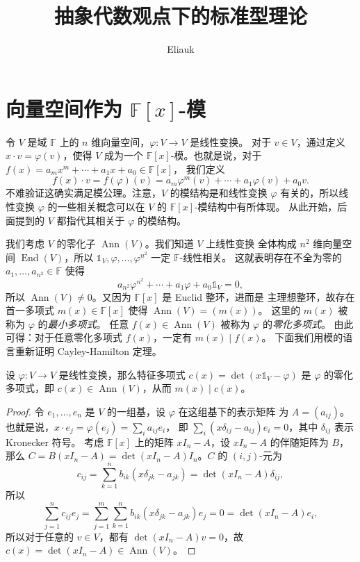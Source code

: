 \documentclass[fontset=none,zihao=-4]{Notes}
\title{\sffamily 抽象代数观点下的标准型理论}
\author{Eliauk}
\DeclareMathOperator\End{End}
\DeclareMathOperator\Ann{Ann}
\begin{document}
\maketitle

\tableofcontents

\section{向量空间作为 \texorpdfstring{$\mathbb{F}[x]$}{F[x]}-模}

令 $V$ 是域 $\mathbb{F}$ 上的 $n$ 维向量空间，$\varphi:V\to V$ 是线性变换。
对于 $v\in V$，通过定义 $x\cdot v=\varphi(v)$，使得 $V$
成为一个 $\mathbb{F}[x]$-模。也就是说，对于 $f(x)=a_mx^m+\cdots+a_1x+a_0\in\mathbb{F}[x]$，
我们定义
\[
  f(x)\cdot v=f(\varphi)(v)=a_m\varphi^m(v)+\cdots+a_1\varphi(v)+a_0v.  
\]
不难验证这确实满足模公理。注意，$V$ 的模结构是和线性变换 $\varphi$ 有关的，所以线性变换 $\varphi$
的一些相关概念可以在 $V$ 的 $\mathbb{F}[x]$-模结构中有所体现。
从此开始，后面提到的 $V$ 都指代其相关于 $\varphi$ 的模结构。

我们考虑 $V$ 的零化子 $\Ann(V)$。我们知道 $V$ 上线性变换
全体构成 $n^2$ 维向量空间 $\End(V)$，所以 
$\mathbb{1}_V,\varphi,\dots,\varphi^{n^2}$ 一定 $\mathbb{F}$-线性相关。
这就表明存在不全为零的 $a_1,\dots,a_{n^2}\in\mathbb{F}$ 使得
\[
  a_{n^2}\varphi^{n^2}+\cdots+a_1\varphi+a_0\mathbb{1}_V=0,
\]
所以 $\Ann(V)\neq 0$。又因为 $\mathbb{F}[x]$ 是 Euclid 整环，进而是
主理想整环，故存在首一多项式 $m(x)\in\mathbb{F}[x]$ 使得 $\Ann(V)=(m(x))$。
这里的 $m(x)$ 被称为 $\varphi$ 的\emph{最小多项式}。
任意 $f(x)\in\Ann(V)$ 被称为 $\varphi$ 的\emph{零化多项式}。
由此可得：对于任意零化多项式 $f(x)$，一定有 $m(x)\mid f(x)$。
下面我们用模的语言重新证明 Cayley-Hamilton 定理。

\begin{theorem}
  设 $\varphi:V\to V$ 是线性变换，那么特征多项式 $c(x)=\det(x\mathbb{1}_V-\varphi)$
  是 $\varphi$ 的零化多项式，即 $c(x)\in \Ann(V)$，从而 $m(x)\mid c(x)$。
\end{theorem}
\begin{proof}
  令 $e_1,\dots,e_n$ 是 $V$ 的一组基，设 $\varphi$ 在这组基下的表示矩阵
  为 $A=(a_{ij})$。也就是说，$x\cdot e_j=\varphi(e_j)=\sum_i a_{ij}e_i$，
  即 $\sum_{i}(x\delta_{ij}-a_{ij})e_i=0$，其中 $\delta_{ij}$ 表示 Kronecker
  符号。  
  考虑 $\mathbb{F}[x]$ 上的矩阵 $xI_n-A$，设 $xI_n-A$ 的伴随矩阵为 $B$，
  那么 $C=B(xI_n-A)=\det(xI_n-A)I_n$。$C$ 的 $(i,j)$-元为
  \[
    c_{ij}=\sum_{k=1}^n b_{ik}(x\delta_{jk}-a_{jk})=\det(xI_n-A)\delta_{ij},
  \]
  所以
  \[
    \sum_{j=1}^n c_{ij}e_j=\sum_{j=1}^m\sum_{k=1}^n b_{ik}(x\delta_{jk}-a_{jk})e_j
    =0=\det(xI_n-A)e_i,
  \]
  所以对于任意的 $v\in V$，都有 $\det(xI_n-A)v=0$，故 $c(x)=\det(xI_n-A)\in\Ann(V)$。
\end{proof}
\end{document}
